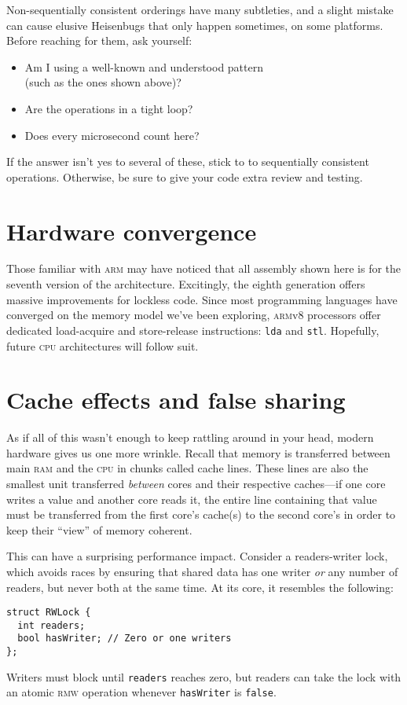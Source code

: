 \documentclass[fontsize=\bodyfontsize, numbers=endperiod]{scrartcl}
\newcommand{\codesize}{\fontsize{\bodyfontsize}{\bodybaselineskip}}
\newcommand{\monobox}[1]{\mbox{\texttt{#1}}}
\newcommand{\keyword}[1]{\monobox{\color{darkGreen}#1}}
\newenvironment{colfigure}
  {\par\vspace{1\baselineskip minus 0.5\baselineskip}\noindent\minipage{\linewidth}}
  {\endminipage\vspace{1\baselineskip minus 0.7\baselineskip}}
\begin{document}
\begin{multicols}{2}
Non-sequentially consistent orderings have many subtleties,
and a slight mistake can cause elusive Heisenbugs that only happen sometimes,
on some platforms.
Before reaching for them, ask yourself:
\begin{itemize}[label={}, before=\itshape]
\item Am I using a well-known and understood pattern \\
      (such as the ones shown above)?
\item Are the operations in a tight loop?
\item Does every microsecond count here?
\end{itemize}
If the answer isn't yes to several of these,
stick to to sequentially consistent operations.
Otherwise, be sure to give your code extra review and testing.

\section{Hardware convergence}

Those familiar with \textsc{arm} may have noticed that all assembly
shown here is for the seventh version of the architecture.
Excitingly, the eighth generation offers massive improvements for lockless code.
Since most programming languages have converged on the memory model we've been
exploring, \textsc{arm}v8 processors offer dedicated load-acquire
and store-release instructions: \keyword{lda} and \keyword{stl}.
Hopefully, future \textsc{cpu} architectures will follow suit.

\section{Cache effects and false sharing}
\label{false-sharing}

As if all of this wasn't enough to keep rattling around in your head,
modern hardware gives us one more wrinkle.
Recall that memory is transferred between main \textsc{ram} and the \textsc{cpu}
in chunks called cache lines.
These lines are also the smallest unit transferred
\emph{between} cores and their respective caches---if one core writes a value
and another core reads it, the entire line containing that value must be
transferred from the first core's cache(s) to the second core's in order to
keep their ``view'' of memory coherent.

This can have a surprising performance impact.
Consider a readers-writer lock,
which avoids races by ensuring that shared data has one writer \emph{or}
any number of readers, but never both at the same time.
At its core, it resembles the following:
\begin{colfigure}
\begin{verbatim}
struct RWLock {
  int readers;
  bool hasWriter; // Zero or one writers
};
\end{verbatim}
\end{colfigure}
Writers must block until \texttt{readers} reaches zero, but
readers can take the lock
with an atomic \textsc{rmw} operation
whenever \texttt{hasWriter} is \texttt{false}.


\end{multicols}
\end{document}
